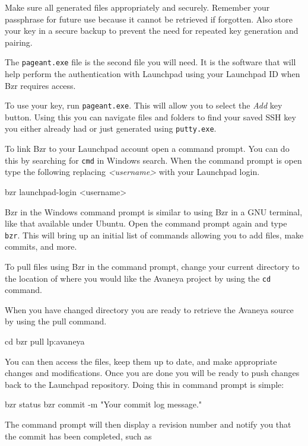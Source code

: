 Make sure all generated files appropriately and securely. Remember your passphrase for future use because it cannot be retrieved if forgotten. Also store your key in a secure backup to prevent the need for repeated key generation and pairing.

The {\tt pageant.exe} file is the second file you will need. It is the software that will help perform the authentication with Launchpad using your Launchpad ID when Bzr requires access.

To use your key, run {\tt pageant.exe}. This will allow you to select the {\it Add} key button. Using this you can navigate files and folders to find your saved SSH key you either already had or just generated using {\tt putty.exe}.


To link Bzr to your Launchpad account open a command prompt. You can do this by searching for {\tt cmd} in Windows search. When the command prompt is open type the following replacing {\it <username>} with your Launchpad login.

\startCodeExample
bzr launchpad-login <username>
\stopCodeExample

Bzr in the Windows command prompt is similar to using Bzr in a GNU terminal, like that available under Ubuntu. Open the command prompt again and type {\tt bzr}. This will bring up an initial list of commands allowing you to add files, make commits, and more.

To pull files using Bzr in the command prompt, change your current directory to the location of where you would like the Avaneya project by using the {\tt cd} command.

When you have changed directory you are ready to retrieve the Avaneya source by using the pull command. 

\startCodeExample
cd \documents\avaneya\trunk
bzr pull lp:avaneya
\stopCodeExample

You can then access the files, keep them up to date, and make appropriate changes and modifications. Once you are done you will be ready to push changes back to the Launchpad repository. Doing this in command prompt is simple:

\startCodeExample
bzr status
bzr commit -m "Your commit log message."
\stopCodeExample

The command prompt will then display a revision number and notify you that the commit has been completed, such as 

